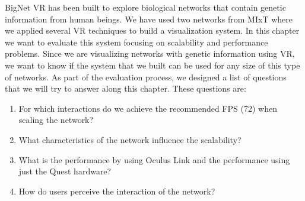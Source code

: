 


BigNet VR has been built to explore biological networks that contain genetic information from human beings. We have used two  networks from MIxT where we applied several VR techniques to build a visualization system. In this chapter we want to evaluate this system focusing on scalability and performance problems. Since we are visualizing networks with genetic information using VR, we want to know if the system that we built can be used for any size of this type of networks. As part of the evaluation process, we designed a list of questions that we will try to answer along this chapter. These questions are:
\begin{enumerate}
  \item For which interactions do we achieve the recommended FPS (72) when scaling the network?
  \item What characteristics of the network influence the scalability?
  \item What is the performance by using Oculus Link and the performance using just the Quest hardware?
  \item How do users perceive the interaction of the network?
\end{enumerate}

